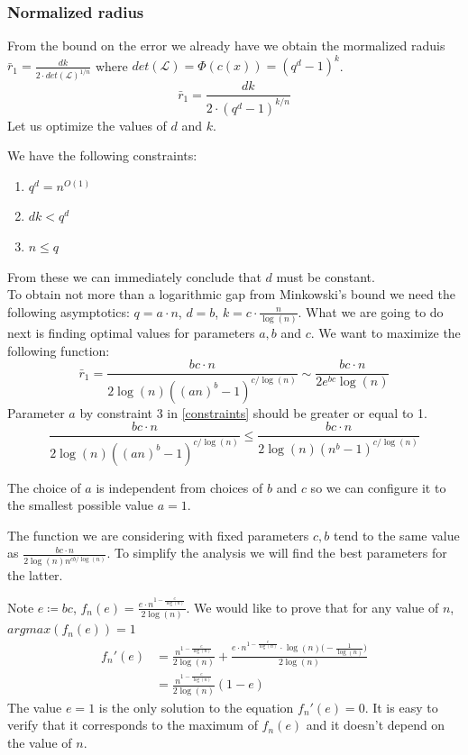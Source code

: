 \documentclass[12pt]{article}
\begin{document}
\subsubsection{Normalized radius}
\label{subsubsec:normalized_discrete_error}
From the bound on the error we already have we obtain the mormalized raduis $\bar{r}_1 = \frac{dk}{2 \cdot det(\mathcal{L})^{1/n}}$ where $det(\mathcal{L}) = \Phi(c(x)) = (q^{d} - 1)^{k}$.
\[
\bar{r}_1 = \frac{dk}{2 \cdot (q^{d} - 1)^{k/n}}
\]
Let us optimize the values of $d$ and $k$.

We have the following constraints:
\begin{enumerate}\label{constraints}
    \item $q^d = n^{O(1)}$
    \item $dk < q^{d}$
    \item $n \leq q$
\end{enumerate}
From these we can immediately conclude that $d$ must be constant. \\

To obtain not more than a logarithmic gap from Minkowski's bound we need the following asymptotics: $q = a \cdot n$, $d = b$, $k =  c \cdot \frac{n}{\log(n)}$. What we are going to do next is finding optimal values for parameters $a, b$ and $c$. We want to maximize the following function:
\[
\bar{r}_1 = \frac{bc \cdot n}{2\log(n)((an)^{b} - 1)^{c/\log(n)}}  \sim \frac{bc \cdot n}{2e^{bc}\log(n)}
\]
 Parameter $a$ by constraint 3 in \ref{constraints} should be greater or equal to 1.
 \[
    \frac{bc \cdot n}{2\log(n)((an)^{b} - 1)^{c/\log(n)}} \leq \frac{bc \cdot n}{2\log(n)(n^{b} - 1)^{c/\log(n)}}
 \]

The choice of $a$ is independent from choices of $b$ and $c$ so we can configure it to the smallest possible value $a = 1$.

The function we are considering with fixed parameters $c, b$ tend to the same value as $\frac{bc \cdot n}{2\log(n)n^{cb/\log(n)}}$. To simplify the analysis we will find the best parameters for the latter.

Note $e \coloneqq bc$, $f_n(e) = \frac{e \cdot n^{1 - \frac{e}
{\log(n)} }}{2\log(n)}$.
We would like to prove that for any value of $n$, $argmax(f_n(e)) = 1$
\[
\begin{split}
    f_n'(e) & = \frac{n^{1 - \frac{e}
    {\log(n)}}}{2\log(n)} + \frac{e \cdot n^{1 - \frac{e}
    {\log(n)}} \cdot \log(n) \big(-\frac{1}{\log(n)}\big)}{2\log(n)} \\
    & = \frac{n^{1 - \frac{e}{\log(n)}}}{2\log(n)}(1-e)
\end{split}
\]
The value $e = 1$ is the only solution to the equation $f_n'(e) = 0$. It is easy to verify that it corresponds to the maximum of $f_n(e)$ and it doesn't depend on the value of $n$.
\end{document}
